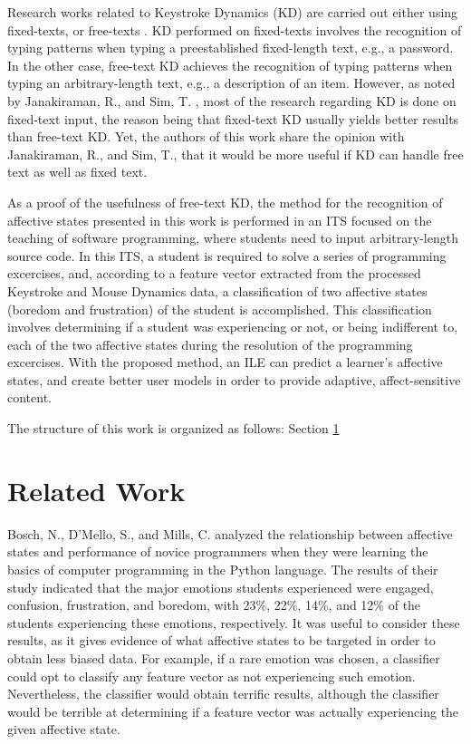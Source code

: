 \documentclass[runningheads,a4paper]{llncs}
\begin{document}
Research works related to Keystroke Dynamics (KD) are carried out either using fixed-texts, or free-texts \cite{free-text-fixed-text}. KD performed on fixed-texts involves the recognition of typing patterns when typing a preestablished fixed-length text, e.g., a password. In the other case, free-text KD achieves the recognition of typing patterns when typing an arbitrary-length text, e.g., a description of an item. However, as noted by Janakiraman, R., and Sim, T. \cite{fixed-is-better}, most of the research regarding KD is done on fixed-text input, the reason being that fixed-text KD usually yields better results than free-text KD. Yet, the authors of this work share the opinion with Janakiraman, R., and Sim, T., that it would be more useful if KD can handle free text as well as fixed text.

As a proof of the usefulness of free-text KD, the method for the recognition of affective states presented in this work is performed in an ITS focused on the teaching of software programming, where students need to input arbitrary-length source code. In this ITS, a student is required to solve a series of programming excercises, and, according to a feature vector extracted from the processed Keystroke and Mouse Dynamics data, a classification of two affective states (boredom and frustration) of the student is accomplished. This classification involves determining if a student was experiencing or not, or being indifferent to, each of the two affective states during the resolution of the programming excercises. With the proposed method, an ILE can predict a learner's affective states, and create better user models in order to provide adaptive, affect-sensitive content.

The structure of this work is organized as follows: Section \ref{related-work}

\section{Related Work}
\label{related-work}

Bosch, N., D'Mello, S., and Mills, C. \cite{emotions-novices-programming} analyzed the relationship between affective states and performance of novice programmers when they were learning the basics of computer programming in the Python language. The results of their study indicated that the major emotions students experienced were engaged, confusion, frustration, and boredom, with 23\%, 22\%, 14\%, and 12\% of the students experiencing these emotions, respectively. It was useful to consider these results, as it gives evidence of what affective states to be targeted in order to obtain less biased data. For example, if a rare emotion was chosen, a classifier could opt to classify any feature vector as not experiencing such emotion. Nevertheless, the classifier would obtain terrific results, although the classifier would be terrible at determining if a feature vector was actually experiencing the given affective state.
\end{document}
